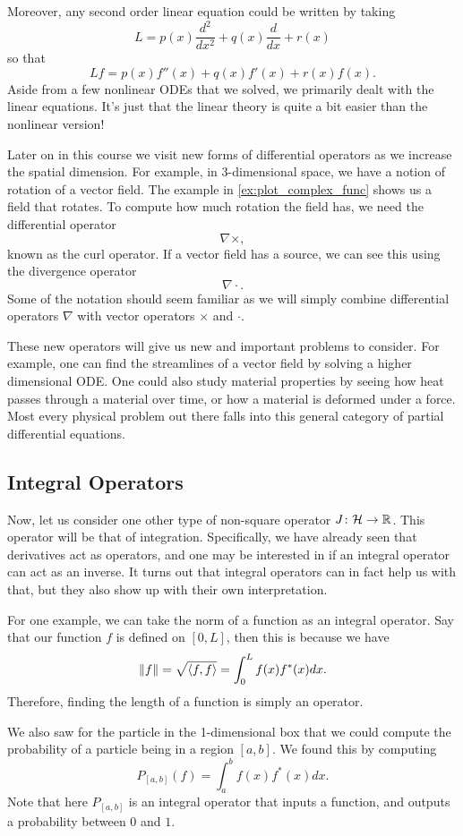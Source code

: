 Moreover, any second order linear equation could be written by taking 
\[
L = p(x) \frac{d^2}{dx^2} + q(x)\frac{d}{dx}+r(x)
\]
so that
\[
Lf = p(x)f''(x)+q(x)f'(x)+r(x)f(x).
\]
Aside from a few nonlinear ODEs that we solved, we primarily dealt with the linear equations. It's just that the linear theory is quite a bit easier than the nonlinear version!

Later on in this course we visit new forms of differential operators as we increase the spatial dimension.  For example, in 3-dimensional space, we have a notion of rotation of a vector field. The example in \ref{ex:plot_complex_func} shows us a field that rotates.  To compute how much rotation the field has, we need the differential operator
\[
\nabla \times,
\]
known as the curl operator.  If a vector field has a source, we can see this using the divergence operator
\[
\nabla \cdot.
\]
Some of the notation should seem familiar as we will simply combine differential operators $\nabla$ with vector operators $\times$ and $\cdot$.  

These new operators will give us new and important problems to consider.  For example, one can find the streamlines of a vector field by solving a higher dimensional ODE.  One could also study material properties by seeing how heat passes through a material over time, or how a material is deformed under a force.  Most every physical problem out there falls into this general category of partial differential equations.

\subsection{Integral Operators}

Now, let us consider one other type of non-square operator $J\colon \mathcal{H} \to \mathbb{R}$.  This operator will be that of integration.  Specifically, we have already seen that derivatives act as operators, and one may be interested in if an integral operator can act as an inverse. It turns out that integral operators can in fact help us with that, but they also show up with their own interpretation.  

For one example, we can take the norm of a function as an integral operator. Say that our function $f$ is defined on $[0,L]$, then this is because we have
\[
\|f\| = \sqrt{\left\langle f, f \right\rangle} = \int_0^L f(x)f^*(x)dx.
\]
Therefore, finding the length of a function is simply an operator. 

We also saw for the particle in the 1-dimensional box that we could compute the probability of a particle being in a region $[a,b]$.  We found this by computing
\[
P_{[a,b]}(f)=\int_a^b f(x)f^*(x)dx.
\]
Note that here $P_{[a,b]}$ is an integral operator that inputs a function, and outputs a probability between $0$ and $1$.

